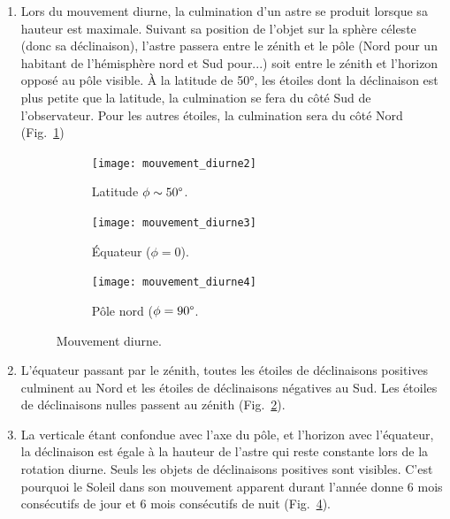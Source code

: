 \documentclass[a4paper,10pt]{report}
\renewcommand{\deg}{\ensuremath{\degree}}
\begin{document}
\begin{Answer}
  \begin{enumerate}
  \item Lors du mouvement diurne, la culmination d'un astre se produit
    lorsque sa hauteur est maximale.  Suivant sa position de l'objet
    sur la sphère céleste (donc sa déclinaison), l'astre passera entre
    le zénith et le pôle (Nord pour un habitant de l'hémisphère nord
    et Sud pour...) soit entre le zénith et l'horizon opposé au pôle
    visible. À la latitude de 50°, les étoiles dont la déclinaison est
    plus petite que la latitude, la culmination se fera du côté Sud de
    l'observateur.  Pour les autres étoiles, la culmination sera du
    côté Nord (Fig.~\ref{mouvementdiurne2})

    \begin{figure}
      \centering
      \begin{subfigure}[b]{0.3\textwidth}
        \centering
        \texttt{[image: mouvement\_diurne2]}
        \caption{Latitude $\phi\sim 50\deg$.}
        \label{mouvementdiurne2}
      \end{subfigure}
      \begin{subfigure}[b]{0.3\textwidth}
        \centering
        \texttt{[image: mouvement\_diurne3]}
        \caption{Équateur ($\phi = 0$).}
        \label{mouvementdiurne3}
      \end{subfigure}
      \begin{subfigure}[b]{0.3\textwidth}
        \centering
        \texttt{[image: mouvement\_diurne4]}
        \caption{Pôle nord ($\phi = 90\deg$.}
        \label{mouvementdiurne4}
      \end{subfigure}
      \caption{Mouvement diurne.}
    \end{figure}

  \item L'équateur passant par le zénith, toutes les étoiles de
    déclinaisons positives culminent au Nord et les étoiles de
    déclinaisons négatives au Sud. Les étoiles de déclinaisons nulles
    passent au zénith (Fig.~\ref{mouvementdiurne3}).

  \item La verticale étant confondue avec l'axe du pôle, et l'horizon
    avec l'équateur, la déclinaison est égale à la hauteur de l'astre
    qui reste constante lors de la rotation diurne.  Seuls les objets
    de déclinaisons positives sont visibles. C'est pourquoi le Soleil
    dans son mouvement apparent durant l'année donne 6 mois
    consécutifs de jour et 6 mois consécutifs de nuit
    (Fig.~\ref{mouvementdiurne4}).
  \end{enumerate}
\end{Answer}
\end{document}
